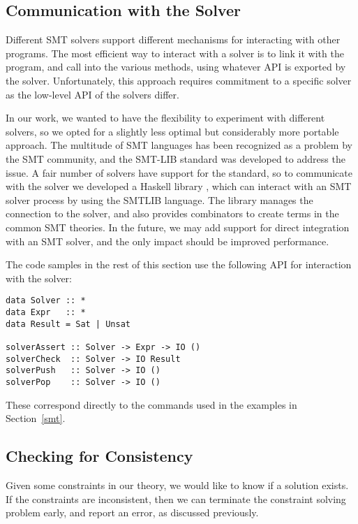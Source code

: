 \documentclass{sigplanconf}
\begin{document}
\subsection{Communication with the Solver}

Different SMT solvers support different mechanisms for interacting
with other programs.  The most efficient way to interact with a solver
is to link it with the program, and call into the various methods,
using whatever API is exported by the solver.  Unfortunately, this
approach requires commitment to a specific solver as the low-level
API of the solvers differ.

In our work, we wanted to have the flexibility to experiment with
different solvers, so we opted for a slightly less optimal but
considerably more portable approach.  The multitude of SMT languages
has been recognized as a problem by the SMT community, and the
SMT-LIB standard \cite{smtlib2} was developed to address the issue.
A fair number of solvers have support for the standard, so
to communicate with the solver we developed a Haskell library
\cite{simple-smt}, which can interact with an SMT solver process
by using the SMTLIB language.  The library manages the connection
to the solver, and also provides combinators to create terms
in the common SMT theories.  In the future, we may add support for
direct integration with an SMT solver, and the only impact
should be improved performance.

The code samples in the rest of this section use the following
API for interaction with the solver:
\begin{Verbatim}
data Solver :: *
data Expr   :: *
data Result = Sat | Unsat

solverAssert :: Solver -> Expr -> IO ()
solverCheck  :: Solver -> IO Result
solverPush   :: Solver -> IO ()
solverPop    :: Solver -> IO ()
\end{Verbatim}
These correspond directly to the commands used in the examples in
Section~\ref{smt}.



\subsection{Checking for Consistency}

Given some constraints in our theory, we would like to know if a
solution exists.  If the constraints are inconsistent, then we can
terminate the constraint solving problem early, and report an error,
as discussed previously.
\end{document}
